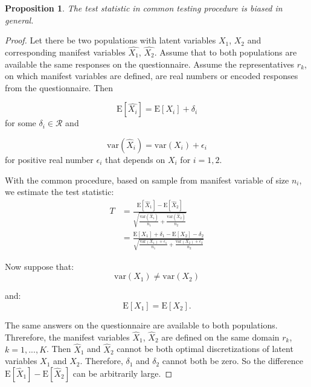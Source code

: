 \documentclass[10pt]{article}
\newtheorem{prop}{Proposition}
\begin{document}
\begin{prop}
The test statistic in common testing procedure is biased in general.
\end{prop}
\begin{proof}
Let there be two populations with latent variables $X_{1}$, $X_{2}$ and corresponding manifest variables $\hat{X_{1}}$, $\hat{X_{2}}$. Assume that to both populations are available the same responses on the questionnaire. Assume the representatives $r_{k}$, on which manifest variables are defined, are real numbers or encoded responses from the questionnaire. Then 

\begin{equation}
\mathrm{E}[\hat{X_{i}}] = \mathrm{E}[X_{i}] + \delta_{i}
\end{equation}
for some $\delta_{i} \in \mathcal{R}$ and

\begin{equation}
\mathrm{var}(\hat{X}_{i}) = \mathrm{var}(X_{i}) + \epsilon_{i}
\end{equation}
for positive real number $\epsilon_{i}$ that depends on $X_{i}$ for $i = 1,2$.

With the common procedure, based on sample from manifest variable of size $n_{i}$, we estimate the test statistic:
\begin{align}
T &= \frac{
\mathrm{E}[\hat{X}_{1}] - \mathrm{E}[\hat{X}_{2}]
}{
\sqrt{
\frac{\mathrm{var}(\hat{X}_{1})}{n_{1}} + 
\frac{\mathrm{var}(\hat{X}_{2})}{n_{2}}
}
} \\
&= \frac{
\mathrm{E}[X_{1}] + \delta_{1} - \mathrm{E}[X_{2}] - \delta_{2}
}{
\sqrt{
\frac{\mathrm{var}(X_{1}) + \epsilon_{1} }{n_{1}} + 
\frac{\mathrm{var}(X_{2}) + \epsilon_{2} }{n_{2}}
}
}
\end{align}

Now suppose that:
\begin{equation}
\mathrm{var}(X_{1}) \neq \mathrm{var}(X_{2})
\end{equation}

and:
\begin{equation}
\mathrm{E}[X_{1}] = \mathrm{E}[X_{2}].
\end{equation}

The same answers on the questionnaire are available to both populations. Threrefore, the manifest variables $\hat{X}_{1}$, $\hat{X}_{2}$ are defined on the same domain $r_{k}$, $k = 1,...,K$. Then $\hat{X}_{1}$ and $\hat{X}_{2}$ cannot be both optimal discretizations of latent variables $X_{1}$ and $X_{2}$. Therefore, $\delta_{1}$ and $\delta_{2}$ cannot both be zero. So the difference $\mathrm{E}[\hat{X}_{1}] - \mathrm{E}[\hat{X}_{2}]$ can be arbitrarily large. 
\end{proof}
\end{document}
